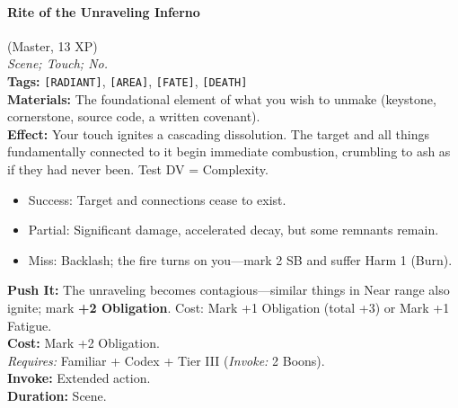 \paragraph{Rite of the Unraveling Inferno} (Master, 13 XP) \hfill \\
\emph{Scene; Touch; No.} \\
\textbf{Tags:} \texttt{[RADIANT]}, \texttt{[AREA]}, \texttt{[FATE]}, \texttt{[DEATH]} \\
\textbf{Materials:} The foundational element of what you wish to unmake (keystone, cornerstone, source code, a written covenant). \\
\textbf{Effect:} Your touch ignites a cascading dissolution. The target and all things fundamentally connected to it begin immediate combustion, crumbling to ash as if they had never been. Test DV = Complexity.
\begin{itemize}
  \item Success: Target and connections cease to exist.
  \item Partial: Significant damage, accelerated decay, but some remnants remain.
  \item Miss: Backlash; the fire turns on you---mark 2 SB and suffer Harm 1 (Burn).
\end{itemize}
\textbf{Push It:} The unraveling becomes contagious---similar things in Near range also ignite; mark \textbf{+2 Obligation}. Cost: Mark +1 Obligation (total +3) or Mark +1 Fatigue. \\
\textbf{Cost:} Mark +2 Obligation. \\
\textit{Requires:} Familiar + Codex + Tier III (\textit{Invoke:} 2 Boons). \\
\textbf{Invoke:} Extended action. \\
\textbf{Duration:} Scene.

